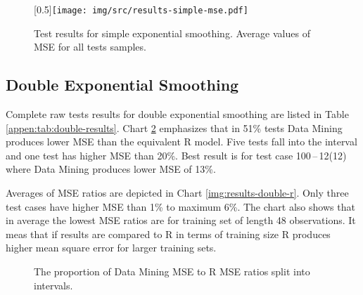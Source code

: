         \begin{figure}[H]
            \begin{center}
                \scalebox{0.65}[0.5]{\texttt{[image: img/src/results-simple-mse.pdf]}}
                \caption{Test results for simple exponential smoothing. Average values of MSE for all tests samples.}
                \label{img:results-simple-mse}
            \end{center}
        \end{figure}

        \subsection{Double Exponential Smoothing} \label{sec:results-double}
        Complete raw tests results for double exponential smoothing are listed in Table \ref{appen:tab:double-results}.
        Chart \ref{img:results-double-pie} emphasizes that in 51\% tests Data Mining produces lower MSE than the
        equivalent R model. Five tests fall into the interval \interval[{1.1,1.2}] and one test has higher
        MSE than 20\%. Best result is for test case 100\,--\,12(12) where Data Mining produces lower MSE of 13\%.

        Averages of MSE ratios are depicted in Chart \ref{img:results-double-r}. Only three test cases have higher
        MSE than 1\% to maximum 6\%. The chart also shows that in average the
        lowest MSE ratios are for training set of length 48 observations. It meas that if results are compared to
        R in terms of training size R produces higher mean square error for larger training sets.

        \begin{figure}[H]
            \begin{center}
                \caption{The proportion of Data Mining MSE to R MSE ratios split into intervals.}
                \label{img:results-double-pie}
            \end{center}
        \end{figure}

